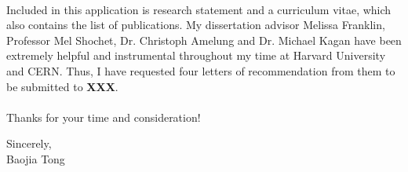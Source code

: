 \documentclass[letterpaper,11pt,oneside]{article}
\begin{document}
\paragraph{}
Included in this application is research statement and a curriculum vitae, which also contains the list of publications. My dissertation advisor Melissa Franklin, Professor Mel Shochet, Dr. Christoph Amelung and Dr. Michael Kagan have been extremely helpful and instrumental throughout my time at Harvard University and CERN. Thus, I have requested four letters of recommendation from them to be submitted to \textbf{XXX}.

\paragraph{}
Thanks for your time and consideration!

\begin{flushright}
Sincerely, \\
\vspace{1em} 
\vspace{1em} 
Baojia Tong \\
\end{flushright}
\end{document}

